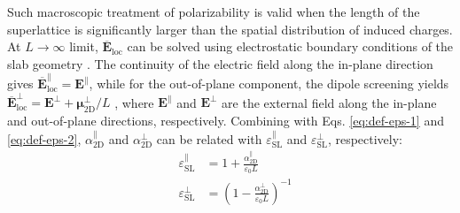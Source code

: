 \documentclass[journal=ancac3,manuscript=article,email=true,hyperref=true,keywords=false]{achemso}
\begin{document}
Such macroscopic treatment of polarizability is valid when the length
of the superlattice is significantly larger than the spatial
distribution of induced charges.  At $L \rightarrow \infty$ limit,
$\boldsymbol{\overline{E}}_{\mathrm{loc}}$ can be solved using
electrostatic boundary conditions of the slab geometry
\cite{Markel_2016,Meyer_2001_dipole_slab}. The continuity of the electric field along the
in-plane direction gives
$\boldsymbol{\overline{E}}^{\parallel}_{\mathrm{loc}}=\boldsymbol{E}^{\parallel}$,
while for the out-of-plane component, the dipole screening yields
$\boldsymbol{\overline{E}}_{\mathrm{loc}}^{\perp}=\boldsymbol{E}^{\perp}+\boldsymbol{\mu}_{\mathrm{2D}}^{\perp}/L$
\cite{Meyer_2001_dipole_slab,T_bik_2004}, where
$\boldsymbol{E}^{\parallel}$ and $\boldsymbol{E}^{\perp}$ are the
external field along the in-plane and out-of-plane directions,
respectively. Combining with Eqs. \ref{eq:def-eps-1} and
\ref{eq:def-eps-2}, $\alpha_{\mathrm{2D}}^{\parallel}$ and
$\alpha_{\mathrm{2D}}^{\perp}$ can be related with
$\varepsilon_{\mathrm{SL}}^{\parallel}$ and
$\varepsilon_{\mathrm{SL}}^{\perp}$, respectively:
%
%
\begin{subequations}
\begin{eqnarray}
  \label{eq:alpha-para-def}
  &\varepsilon_{\mathrm{SL}}^{\parallel} &= 1 + \frac{\alpha_{\mathrm{2D}}^{\parallel}}{\varepsilon_{0}L}\\
  \label{eq:alpha-perp-def}
  &\varepsilon_{\mathrm{SL}}^{\perp} &= \left(1 - {\displaystyle \frac{\alpha_{\mathrm{2D}}^{\perp}}{\varepsilon_{\mathrm{0}} L}} \right)^{-1}
\end{eqnarray}
\end{subequations}
\end{document}
